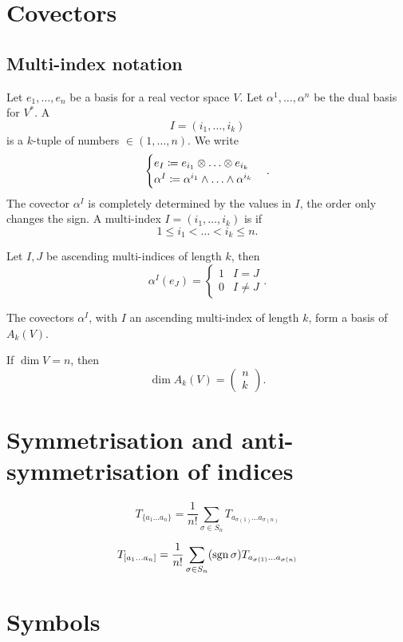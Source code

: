 \section{Covectors}

\subsection{Multi-index notation}
Let $e_1,\ldots, e_n$ be a basis for a real vector space $V$. Let $\alpha^1,\ldots, \alpha^n$ be the dual basis for $V^*$. A 
\[ I = (i_1,\ldots,i_k)\]
is a $k$-tuple of numbers $\in (1,\ldots,n)$. We write
\[ \begin{cases}
e_I \coloneqq e_{i_1}\otimes\ldots\otimes e_{i_k}\\
\alpha^I \coloneqq \alpha^{i_1}\wedge\ldots \wedge\alpha^{i_k}
\end{cases}. \]
The covector $\alpha^I$ is completely determined by the values in $I$, the order only changes the sign. A multi-index $I = (i_1,\ldots,i_k)$ is  if
\[ 1\leq i_1<\ldots<i_k\leq n. \]
\begin{proposition}
Let $I,J$ be ascending multi-indices of length $k$, then
\[ \alpha^I(e_J) = \begin{cases}
1 & I=J \\ 0& I\neq J
\end{cases}. \]
\end{proposition}
\begin{proposition}
The covectors $\alpha^I$, with $I$ an ascending multi-index of length $k$, form a basis of $A_k(V)$.
\end{proposition}
\begin{corollary}
If $\dim V=n$, then
\[ \dim A_k(V) = \begin{pmatrix}
n\\k
\end{pmatrix}. \]
\end{corollary}

\section{Symmetrisation and anti-symmetrisation of indices}

\[ T_{\{a_1\dots a_n\}} = \frac{1}{n!} \sum_{\sigma\in S_n} T_{a_{\sigma(1)} \dots a_{\sigma(n)}} \]

\[ T_{[a_1\dots a_n]} = \frac{1}{n!} \sum_{\sigma\in S_n} (\operatorname{sgn} \sigma)T_{a_{\sigma(1)} \dots a_{\sigma(n)}} \]
\section{Symbols}
